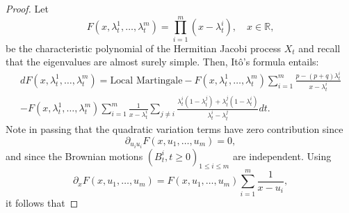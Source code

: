 \documentclass[10pt,a4paper]{amsart}
\begin{document}
\begin{proof}
	Let
	\begin{equation*}
		F(x,\lambda_t^1, \dots, \lambda_t^m) =
		\prod_{i=1}^m(x-\lambda_t^i), \quad x \in \mathbb{R},
	\end{equation*}
	be the characteristic polynomial of the Hermitian Jacobi process $X_t$ and recall that the eigenvalues are almost surely simple. Then, It\^o's formula entails:
	\begin{multline*}
		dF(x, \lambda_t^1, \dots, \lambda_t^m) = \textrm{Local Martingale}
		-F(x, \lambda_t^1, \dots, \lambda_t^m)\sum_{i=1}^m\frac{p-(p+q)\lambda_t^i}{x-\lambda_t^i}
		\\-F(x, \lambda_t^1, \dots, \lambda_t^m)\sum_{i=1}^m\frac{1}{x-\lambda_t^i}
		\sum_{j\neq i}\frac{\lambda_t^i(1-\lambda_t^j) + \lambda_t^j(1-\lambda_t^i)}{\lambda_t^i-\lambda_t^j} dt.
	\end{multline*}
	Note in passing that the quadratic variation terms have zero contribution since
	\begin{equation*}
		\partial_{u_iu_i}F(x, u_1, \dots, u_m) = 0,
	\end{equation*}
	and since the Brownian motions $(B_t^i, t \geq 0)_{1 \leq i \leq m}$ are independent.
	Using
	\begin{equation*}
		\partial_xF(x, u_1, \dots, u_m) = F(x, u_1, \dots, u_m)\sum_{i=1}^m \frac{1}{x-u_i},
	\end{equation*}
	it follows that


\end{proof}
\end{document}
